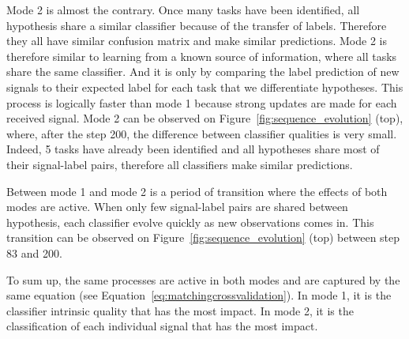 Mode 2 is almost the contrary. Once many tasks have been identified, all hypothesis share a similar classifier because of the transfer of labels. Therefore they all have similar confusion matrix and make similar predictions. Mode 2 is therefore similar to learning from a known source of information, where all tasks share the same classifier. And it is only by comparing the label prediction of new signals to their expected label for each task that we differentiate hypotheses. This process is logically faster than mode 1 because strong updates are made for each received signal. Mode 2 can be observed on Figure~\ref{fig:sequence_evolution} (top), where, after the step 200, the difference between classifier qualities is very small. Indeed, 5 tasks have already been identified and all hypotheses share most of their signal-label pairs, therefore all classifiers make similar predictions. 

Between mode 1 and mode 2 is a period of transition where the effects of both modes are active. When only few signal-label pairs are shared between hypothesis, each classifier evolve quickly as new observations comes in. This transition can be observed on Figure~\ref{fig:sequence_evolution} (top) between step 83 and 200.



To sum up, the same processes are active in both modes and are captured by the same equation (see Equation~\ref{eq:matchingcrossvalidation}). In mode 1, it is the classifier intrinsic quality that has the most impact. In mode 2, it is the classification of each individual signal that has the most impact. 


